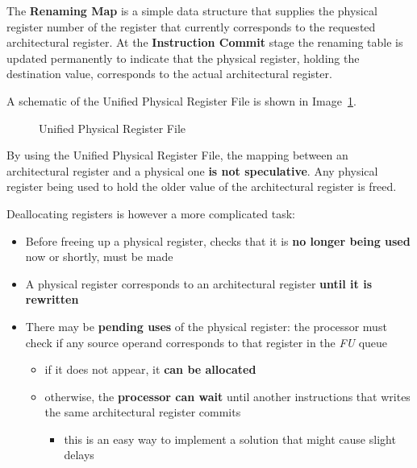 \documentclass[english]{article}
\begin{document}
The \textbf{Renaming Map} is a simple data structure that supplies the physical register number of the register that currently corresponds to the requested architectural register.
At the \textbf{Instruction Commit} stage the renaming table is updated permanently to indicate that the physical register, holding the destination value, corresponds to the actual architectural register.

A schematic of the Unified Physical Register File is shown in Image~\ref{fig:unified-physical-register-file}.

\begin{figure}[htbp]
  \bigskip
  \centering
  \caption{Unified Physical Register File}
  \label{fig:unified-physical-register-file}
  \bigskip
\end{figure}

\bigskip
By using the Unified Physical Register File, the mapping between an architectural register and a physical one \textbf{is not speculative}.
Any physical register being used to hold the older value of the architectural register is freed.

Deallocating registers is however a more complicated task:

\begin{itemize}
  \item Before freeing up a physical register, checks that it is \textbf{no longer being used} now or shortly, must be made
  \item A physical register corresponds to an architectural register \textbf{until it is rewritten}
  \item There may be \textbf{pending uses} of the physical register: the processor must check if any source operand corresponds to that register in the \textit{FU} queue
        \begin{itemize}
          \item if it does not appear, it \textbf{can be allocated}
          \item otherwise, the \textbf{processor can wait} until another instructions that writes the same architectural register commits
                \begin{itemize}
                  \item this is an easy way to implement a solution that might cause slight delays
                \end{itemize}
        \end{itemize}
\end{itemize}
\end{document}
